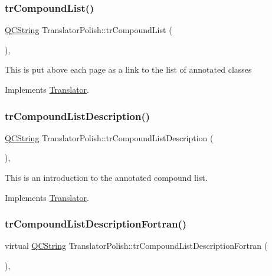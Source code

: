 \subsubsection{\texorpdfstring{trCompoundList()}{trCompoundList()}}
{\footnotesize\ttfamily \mbox{\hyperlink{class_q_c_string}{Q\+C\+String}} Translator\+Polish\+::tr\+Compound\+List (\begin{DoxyParamCaption}{ }\end{DoxyParamCaption})\hspace{0.3cm}{\ttfamily [inline]}, {\ttfamily [virtual]}}

This is put above each page as a link to the list of annotated classes 

Implements \mbox{\hyperlink{class_translator}{Translator}}.

\mbox{\label{class_translator_polish_a778bd46cc4a34385a3ea7f12be1d8b75}} 
\subsubsection{\texorpdfstring{trCompoundListDescription()}{trCompoundListDescription()}}
{\footnotesize\ttfamily \mbox{\hyperlink{class_q_c_string}{Q\+C\+String}} Translator\+Polish\+::tr\+Compound\+List\+Description (\begin{DoxyParamCaption}{ }\end{DoxyParamCaption})\hspace{0.3cm}{\ttfamily [inline]}, {\ttfamily [virtual]}}

This is an introduction to the annotated compound list. 

Implements \mbox{\hyperlink{class_translator}{Translator}}.

\mbox{\label{class_translator_polish_a0eaf14810bf38ced00e900d8b82135a8}} 
\subsubsection{\texorpdfstring{trCompoundListDescriptionFortran()}{trCompoundListDescriptionFortran()}}
{\footnotesize\ttfamily virtual \mbox{\hyperlink{class_q_c_string}{Q\+C\+String}} Translator\+Polish\+::tr\+Compound\+List\+Description\+Fortran (\begin{DoxyParamCaption}{ }\end{DoxyParamCaption})\hspace{0.3cm}{\ttfamily [inline]}, {\ttfamily [virtual]}}

